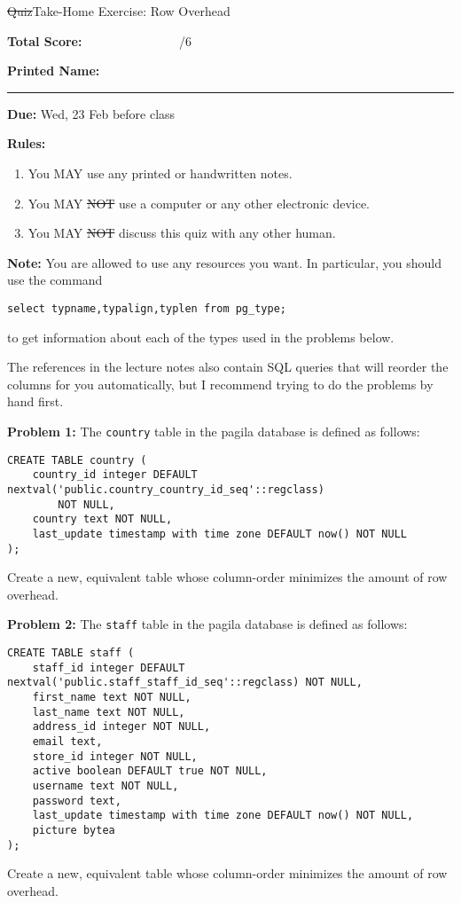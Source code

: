 \documentclass[10pt]{article}
\theoremstyle{definition}
\begin{document}
\begin{center}
{
\Large
    \sout{Quiz}Take-Home Exercise: Row Overhead
}

    \vspace{0.1in}
\end{center}


\vspace{0.15in}
\noindent
\textbf{Total Score:} ~~~~~~~~~~~~~~~/6

\vspace{0.5in}
\noindent
\textbf{Printed Name:}

\noindent
\rule{\textwidth}{0.1pt}
\vspace{0.25in}

\noindent\textbf{Due:} Wed, 23 Feb before class

\vspace{0.15in}
\noindent
\textbf{Rules:}
\begin{enumerate}
    \item You MAY use any printed or handwritten notes.
    \item You MAY \sout{NOT} use a computer or any other electronic device.
    \item You MAY \sout{NOT} discuss this quiz with any other human.
\end{enumerate}

\noindent
\textbf{Note:}
You are allowed to use any resources you want.
In particular, you should use the command
\begin{lstlisting}
select typname,typalign,typlen from pg_type;
\end{lstlisting}
to get information about each of the types used in the problems below.

The references in the lecture notes also contain SQL queries that will reorder the columns for you automatically, but I recommend trying to do the problems by hand first.

\newpage
\noindent
\textbf{Problem 1:}
The \lstinline{country} table in the pagila database is defined as follows:
\begin{lstlisting}
CREATE TABLE country (
    country_id integer DEFAULT nextval('public.country_country_id_seq'::regclass)
        NOT NULL,
    country text NOT NULL,
    last_update timestamp with time zone DEFAULT now() NOT NULL
);
\end{lstlisting}
Create a new, equivalent table whose column-order minimizes the amount of row overhead.


\newpage
\noindent
\textbf{Problem 2:}
The \lstinline{staff} table in the pagila database is defined as follows:
\begin{lstlisting}
CREATE TABLE staff (
    staff_id integer DEFAULT nextval('public.staff_staff_id_seq'::regclass) NOT NULL,
    first_name text NOT NULL,
    last_name text NOT NULL,
    address_id integer NOT NULL,
    email text,
    store_id integer NOT NULL,
    active boolean DEFAULT true NOT NULL,
    username text NOT NULL,
    password text,
    last_update timestamp with time zone DEFAULT now() NOT NULL,
    picture bytea
);
\end{lstlisting}
Create a new, equivalent table whose column-order minimizes the amount of row overhead.
\end{document}
